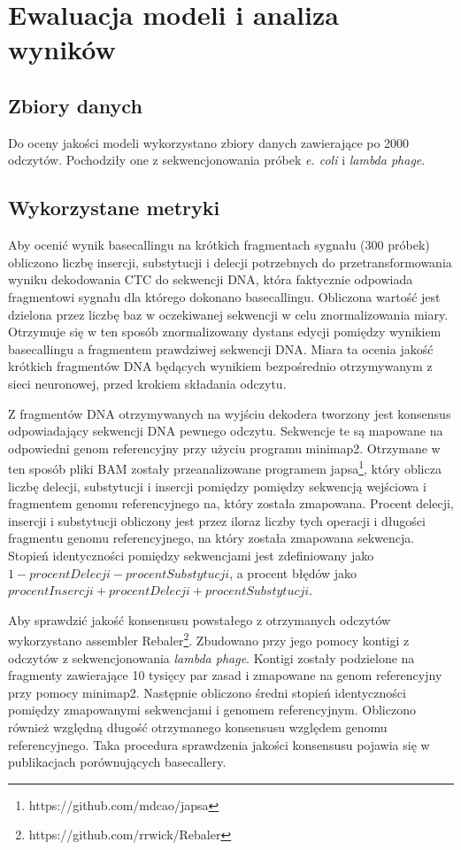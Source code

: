 \documentclass[a4paper,11pt,twoside]{report}
\theoremstyle{definition}
\begin{document}
\chapter{Ewaluacja modeli i analiza wyników}

\section{Zbiory danych}

Do oceny jakości modeli wykorzystano zbiory danych zawierające po 2000 odczytów. Pochodziły one z sekwencjonowania próbek \textit{e. coli} i \textit{lambda phage}\cite{chironData}.

\section{Wykorzystane metryki}

Aby ocenić wynik basecallingu na krótkich fragmentach sygnału (300 próbek) obliczono liczbę insercji, substytucji i delecji potrzebnych do przetransformowania wyniku dekodowania CTC do sekwencji DNA, która faktycznie odpowiada fragmentowi sygnału dla którego dokonano basecallingu. Obliczona wartość jest dzielona przez liczbę baz w oczekiwanej sekwencji w celu znormalizowania miary. Otrzymuje się w ten sposób znormalizowany dystans edycji pomiędzy wynikiem basecallingu a fragmentem prawdziwej sekwencji DNA. Miara ta ocenia jakość krótkich fragmentów DNA będących wynikiem bezpośrednio otrzymywanym z sieci neuronowej, przed krokiem składania odczytu.

Z fragmentów DNA otrzymywanych na wyjściu dekodera tworzony jest konsensus odpowiadający sekwencji DNA pewnego odczytu. Sekwencje te są mapowane na odpowiedni genom referencyjny przy użyciu programu minimap2\cite{minimap}. Otrzymane w ten sposób pliki BAM zostały przeanalizowane programem japsa\footnote{https://github.com/mdcao/japsa}, który oblicza liczbę delecji, substytucji i insercji pomiędzy pomiędzy sekwencją wejściowa i fragmentem genomu referencyjnego na, który została zmapowana. Procent delecji, insercji i substytucji obliczony jest przez iloraz liczby tych operacji i długości fragmentu genomu referencyjnego, na który została zmapowana sekwencja. Stopień identyczności pomiędzy sekwencjami jest zdefiniowany jako $1-procentDelecji-procentSubstytucji$, a procent błędów jako $procentInsercji + procentDelecji + procentSubstytucji$.

Aby sprawdzić jakość konsensusu powstałego z otrzymanych odczytów wykorzystano assembler Rebaler\footnote{https://github.com/rrwick/Rebaler}. Zbudowano przy jego pomocy kontigi z odczytów z sekwencjonowania \textit{lambda phage}. Kontigi zostały podzielone na fragmenty zawierające 10 tysięcy par zasad i zmapowane na genom referencyjny przy pomocy minimap2. Następnie obliczono średni stopień identyczności pomiędzy zmapowanymi sekwencjami i genomem referencyjnym. Obliczono również względną długość otrzymanego konsensusu względem genomu referencyjnego. Taka procedura sprawdzenia jakości konsensusu pojawia się w publikacjach porównujących basecallery\cite{wick}\cite{chiron}.
\end{document}

